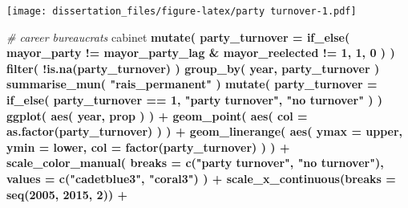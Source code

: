 \documentclass[12pt,]{book}
\newenvironment{Shaded}{\begin{snugshade}}{\end{snugshade}}
\newcommand{\CommentTok}[1]{\textcolor[rgb]{0.56,0.35,0.01}{\textit{#1}}}
\newcommand{\DataTypeTok}[1]{\textcolor[rgb]{0.13,0.29,0.53}{#1}}
\newcommand{\DecValTok}[1]{\textcolor[rgb]{0.00,0.00,0.81}{#1}}
\newcommand{\KeywordTok}[1]{\textcolor[rgb]{0.13,0.29,0.53}{\textbf{#1}}}
\newcommand{\NormalTok}[1]{#1}
\newcommand{\OperatorTok}[1]{\textcolor[rgb]{0.81,0.36,0.00}{\textbf{#1}}}
\newcommand{\StringTok}[1]{\textcolor[rgb]{0.31,0.60,0.02}{#1}}
\begin{document}
\texttt{[image: dissertation\_files/figure-latex/party turnover-1.pdf]}

\begin{Shaded}
\begin{Highlighting}[]
\CommentTok{# career bureaucrats}
\NormalTok{cabinet }\OperatorTok{%>%}
\StringTok{  }\KeywordTok{mutate}\NormalTok{(}
    \DataTypeTok{party_turnover =} \KeywordTok{if_else}\NormalTok{(}
\NormalTok{      mayor_party }\OperatorTok{!=}\StringTok{ }\NormalTok{mayor_party_lag }\OperatorTok{&}
\StringTok{      }\NormalTok{mayor_reelected }\OperatorTok{!=}\StringTok{ }\DecValTok{1}\NormalTok{,}
      \DecValTok{1}\NormalTok{, }\DecValTok{0}
\NormalTok{    )}
\NormalTok{  ) }\OperatorTok{%>%}
\StringTok{  }\KeywordTok{filter}\NormalTok{(}
    \OperatorTok{!}\KeywordTok{is.na}\NormalTok{(party_turnover)}
\NormalTok{  ) }\OperatorTok{%>%}
\StringTok{  }\KeywordTok{group_by}\NormalTok{(}
\NormalTok{    year,}
\NormalTok{    party_turnover}
\NormalTok{  ) }\OperatorTok{%>%}
\StringTok{  }\KeywordTok{summarise_mun}\NormalTok{(}
    \StringTok{"rais_permanent"}
\NormalTok{  ) }\OperatorTok{%>%}
\StringTok{  }\KeywordTok{mutate}\NormalTok{(}
    \DataTypeTok{party_turnover =} \KeywordTok{if_else}\NormalTok{(}
\NormalTok{      party_turnover }\OperatorTok{==}\StringTok{ }\DecValTok{1}\NormalTok{,}
      \StringTok{"party turnover"}\NormalTok{, }\StringTok{"no turnover"}
\NormalTok{    )}
\NormalTok{  ) }\OperatorTok{%>%}\StringTok{ }
\StringTok{  }\KeywordTok{ggplot}\NormalTok{(}
    \KeywordTok{aes}\NormalTok{(}
\NormalTok{      year,}
\NormalTok{      prop}
\NormalTok{    )}
\NormalTok{  ) }\OperatorTok{+}
\StringTok{  }\KeywordTok{geom_point}\NormalTok{(}
    \KeywordTok{aes}\NormalTok{(}
      \DataTypeTok{col =} \KeywordTok{as.factor}\NormalTok{(party_turnover)}
\NormalTok{    )}
\NormalTok{  ) }\OperatorTok{+}
\StringTok{  }\KeywordTok{geom_linerange}\NormalTok{(}
    \KeywordTok{aes}\NormalTok{(}
      \DataTypeTok{ymax =}\NormalTok{ upper,}
      \DataTypeTok{ymin =}\NormalTok{ lower,}
      \DataTypeTok{col =} \KeywordTok{factor}\NormalTok{(party_turnover)}
\NormalTok{    )}
\NormalTok{  ) }\OperatorTok{+}
\StringTok{  }\KeywordTok{scale_color_manual}\NormalTok{(}
    \DataTypeTok{breaks =} \KeywordTok{c}\NormalTok{(}\StringTok{"party turnover"}\NormalTok{, }\StringTok{"no turnover"}\NormalTok{),}
    \DataTypeTok{values =} \KeywordTok{c}\NormalTok{(}\StringTok{"cadetblue3"}\NormalTok{, }\StringTok{"coral3"}\NormalTok{)}
\NormalTok{  ) }\OperatorTok{+}
\StringTok{  }\KeywordTok{scale_x_continuous}\NormalTok{(}\DataTypeTok{breaks =} \KeywordTok{seq}\NormalTok{(}\DecValTok{2005}\NormalTok{, }\DecValTok{2015}\NormalTok{, }\DecValTok{2}\NormalTok{)) }\OperatorTok{+}
}}}}}}
\end{Highlighting}
\end{Shaded}
\end{document}
